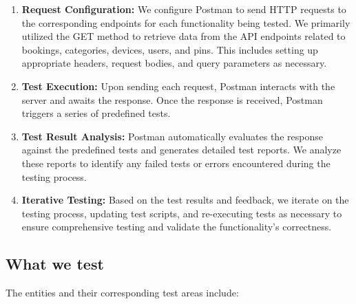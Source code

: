 \begin{enumerate}
    \item \textbf{Request Configuration:} We configure Postman to send HTTP requests to the corresponding endpoints for each functionality being tested. We primarily utilized the GET method to retrieve data from the API endpoints related to bookings, categories, devices, users, and pins. This includes setting up appropriate headers, request bodies, and query parameters as necessary.

    \item \textbf{Test Execution:} Upon sending each request, Postman interacts with the server and awaits the response. Once the response is received, Postman triggers a series of predefined tests.

    \item \textbf{Test Result Analysis:} Postman automatically evaluates the response against the predefined tests and generates detailed test reports. We analyze these reports to identify any failed tests or errors encountered during the testing process.

    \item \textbf{Iterative Testing:} Based on the test results and feedback, we iterate on the testing process, updating test scripts, and re-executing tests as necessary to ensure comprehensive testing and validate the functionality’s correctness.
\end{enumerate}

\subsection{What we test}

The entities and their corresponding test areas include:

